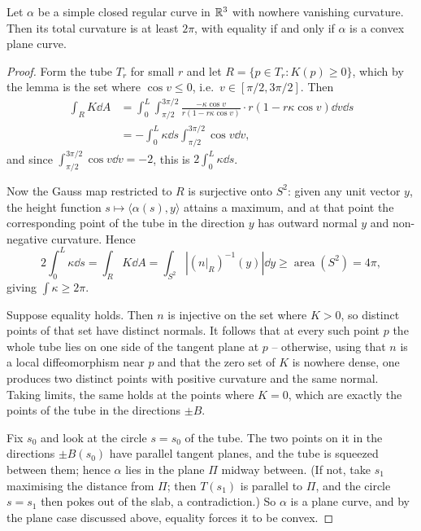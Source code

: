 \documentclass[a4paper]{scrartcl}
\begin{document}
\begin{theorem}[Fenchel]
    Let $\alpha$ be a simple closed regular curve in $\mathbb{R}^3$ with nowhere vanishing curvature. Then its total curvature is at least $2\pi$, with equality if and only if $\alpha$ is a convex plane curve.
\end{theorem}
\begin{proof}
    Form the tube $T_r$ for small $r$ and let $R = \{p \in T_r : K(p) \geq 0\}$, which by the lemma is the set where $\cos v \leq 0$, i.e.\ $v \in [\pi/2, 3\pi/2]$. Then
    $$
    \begin{aligned}
    \int_R K \dd A &= \int_0^L\int_{\pi/2}^{3\pi/2} \frac{-\kappa\cos v}{r(1-r\kappa\cos v)}\cdot r\left(1-r\kappa\cos v\right)\dd v \dd s \\
    &= -\int_0^L\kappa \dd s\int_{\pi/2}^{3\pi/2}\cos v \dd v,
    \end{aligned}
    $$
    and since $\int_{\pi/2}^{3\pi/2}\cos v \dd v = -2$, this is $2\int_0^L\kappa \dd s$.

    Now the Gauss map restricted to $R$ is surjective onto $S^2$: given any unit vector $y$, the height function $s \mapsto \langle \alpha(s), y\rangle$ attains a maximum, and at that point the corresponding point of the tube in the direction $y$ has outward normal $y$ and non-negative curvature. Hence
    $$
    2\int_0^L\kappa\dd s = \int_R K \dd A = \int_{S^2}\left|\left(\left.n\right|_R\right)^{-1}(y)\right|\dd y \geq \operatorname{area}(S^2) = 4\pi,
    $$
    giving $\int\kappa \geq 2\pi$.

    Suppose equality holds. Then $n$ is injective on the set where $K > 0$, so distinct points of that set have distinct normals. It follows that at every such point $p$ the whole tube lies on one side of the tangent plane at $p$ -- otherwise, using that $n$ is a local diffeomorphism near $p$ and that the zero set of $K$ is nowhere dense, one produces two distinct points with positive curvature and the same normal. Taking limits, the same holds at the points where $K = 0$, which are exactly the points of the tube in the directions $\pm B$.

    Fix $s_0$ and look at the circle $s = s_0$ of the tube. The two points on it in the directions $\pm B(s_0)$ have parallel tangent planes, and the tube is squeezed between them; hence $\alpha$ lies in the plane $\Pi$ midway between. (If not, take $s_1$ maximising the distance from $\Pi$; then $T(s_1)$ is parallel to $\Pi$, and the circle $s = s_1$ then pokes out of the slab, a contradiction.) So $\alpha$ is a plane curve, and by the plane case discussed above, equality forces it to be convex.
\end{proof}
\end{document}
